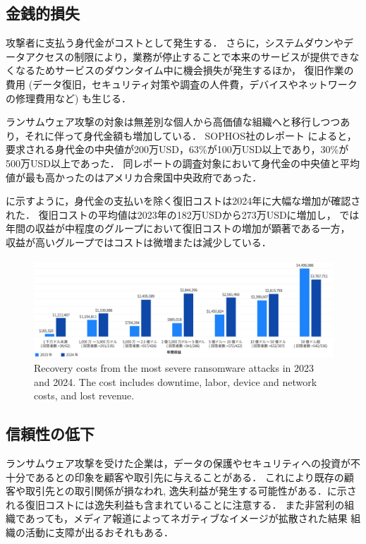 \subsection{金銭的損失}
攻撃者に支払う身代金がコストとして発生する．
さらに，システムダウンやデータアクセスの制限により，業務が停止することで本来のサービスが提供できなくなるためサービスのダウンタイム中に機会損失が発生するほか，
復旧作業の費用 (データ復旧，セキュリティ対策や調査の人件費，デバイスやネットワークの修理費用など) も生じる．

ランサムウェア攻撃の対象は無差別な個人から高価値な組織へと移行しつつあり，それに伴って身代金額も増加している．
SOPHOS社のレポート \cite{sophos-report:online} によると，
要求される身代金の中央値が200万USD，63\%が100万USD以上であり，30\%が500万USD以上であった．
同レポートの調査対象において身代金の中央値と平均値が最も高かったのはアメリカ合衆国中央政府であった．

に示すように，身代金の支払いを除く復旧コストは2024年に大幅な増加が確認された．
復旧コストの平均値は2023年の182万USDから273万USDに増加し\cite{sophos-report:online,spycloud-ransomware}，
では年間の収益が中程度のグループにおいて復旧コストの増加が顕著である一方，
収益が高いグループではコストは微増または減少している．
\begin{figure}[t]
  \begin{center}
    \includegraphics[width=\columnwidth]{doc/img/recovery-cost.eps}
  \end{center}
  \caption{Recovery costs from the most severe ransomware attacks in 2023 and 2024.
    The cost includes downtime, labor, device and network costs, and lost revenue. \cite{sophos-report:online}}
  \label{fig:recovery-cost}
\end{figure}

\subsection{信頼性の低下}
ランサムウェア攻撃を受けた企業は，データの保護やセキュリティへの投資が不十分であるとの印象を顧客や取引先に与えることがある．
これにより既存の顧客や取引先との取引関係が損なわれ,
逸失利益が発生する可能性がある．に示される復旧コストには逸失利益も含まれていることに注意する．
また非営利の組織であっても，メディア報道によってネガティブなイメージが拡散された結果
組織の活動に支障が出るおそれもある．

